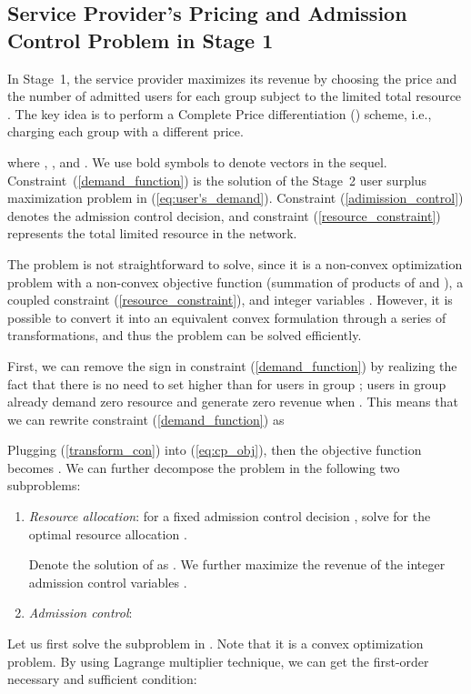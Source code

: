 \documentclass[twocolumn,10pt,twosided]{IEEEtran}
\begin{document}
\subsection{Service Provider's Pricing and Admission Control Problem in Stage 1}
\label{sec:sp_cpd}
In Stage~1, the service provider maximizes its revenue by choosing  the price  and the  number of admitted users  for each group  subject to the limited total resource . The key idea is to perform a Complete Price differentiation () scheme, i.e., charging each group with a different price.

where , , and . We use bold symbols to
denote vectors in the sequel. Constraint~(\ref{demand_function}) is the solution of the Stage~2 user surplus maximization problem in (\ref{eq:user's_demand}). Constraint
(\ref{adimission_control}) denotes the admission control decision, and
constraint (\ref{resource_constraint}) represents the total limited
resource in the network.

The  problem  is not straightforward to solve, since it is a non-convex
optimization problem with a non-convex objective function (summation of
products of  and ), a coupled constraint
(\ref{resource_constraint}), and integer variables .
However, it is possible to convert it into an equivalent convex
formulation  through a series of transformations, and thus the problem can be solved efficiently.

First, we can remove the  sign in constraint (\ref{demand_function}) by realizing the fact that there is no need to set  higher than   for users in group
; users in group  already demand zero resource and
generate zero revenue  when . This means that we can rewrite constraint
(\ref{demand_function}) as

Plugging (\ref{transform_con}) into (\ref{eq:cp_obj}), then the objective function becomes .
We can further decompose the  problem in the following two subproblems:
\begin{enumerate}
\item \emph{Resource allocation}: for a fixed admission control decision ,  solve for the optimal resource allocation .


Denote the solution of  as . We further maximize the revenue of the integer admission control variables .
\item \textit{Admission control}:
    
\end{enumerate}

Let us first solve the  subproblem   in . Note that it is a convex optimization problem. By using Lagrange multiplier technique, we can get the first-order necessary and sufficient condition:
\end{document}
